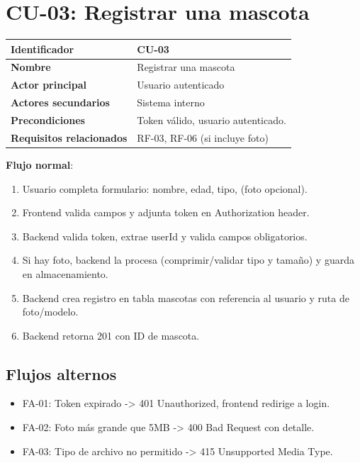 \documentclass[12pt,a4paper]{article}
\begin{document}
\newpage
\section{CU-03: Registrar una mascota}
\begin{tabular}{|p{3.5cm}|p{10cm}|}
\hline
\textbf{Identificador} & CU-03 \\
\hline
\textbf{Nombre} & Registrar una mascota \\
\hline
\textbf{Actor principal} & Usuario autenticado \\
\hline
\textbf{Actores secundarios} & Sistema interno \\
\hline
\textbf{Precondiciones} & Token v\'alido, usuario autenticado. \\
\hline
\textbf{Requisitos relacionados} & RF-03, RF-06 (si incluye foto) \\
\hline
\end{tabular}

\vspace{0.5em}
\textbf{Flujo normal}:
\begin{enumerate}[leftmargin=*]
    \item Usuario completa formulario: nombre, edad, tipo, (foto opcional).
    \item Frontend valida campos y adjunta token en Authorization header.
    \item Backend valida token, extrae userId y valida campos obligatorios.
    \item Si hay foto, backend la procesa (comprimir/validar tipo y tama\~no) y guarda en almacenamiento.
    \item Backend crea registro en tabla mascotas con referencia al usuario y ruta de foto/modelo.
    \item Backend retorna 201 con ID de mascota.
\end{enumerate}

\subsection*{Flujos alternos}
\begin{itemize}[leftmargin=*]
    \item FA-01: Token expirado -> 401 Unauthorized, frontend redirige a login.
    \item FA-02: Foto m\'as grande que 5MB -> 400 Bad Request con detalle.
    \item FA-03: Tipo de archivo no permitido -> 415 Unsupported Media Type.
\end{itemize}
\end{document}
